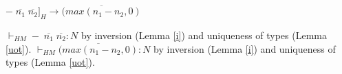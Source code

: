 \begin{case}
$-\;\overline{n_{1}}\;\overline{n_{2}}]_{H}\rightarrow\overline{(max(n_{1}-n_{2},0)}$

$\vdash_{HM}-\;\overline{n_{1}}\;\overline{n_{2}}:N$ by inversion (Lemma \ref{i}) and uniqueness of types (Lemma \ref{uot}).  $\vdash_{HM}\overline{(max(n_{1}-n_{2},0)}:N$ by inversion (Lemma \ref{i}) and uniqueness of types (Lemma \ref{uot}).
\end{case}